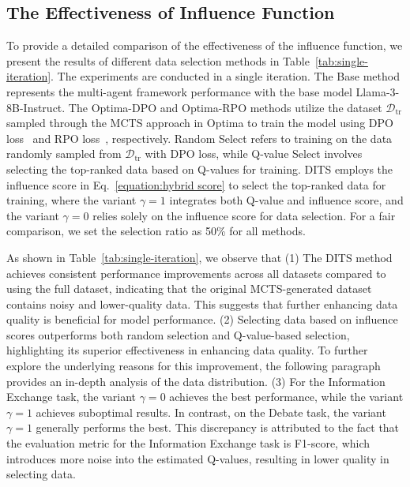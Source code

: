\subsection{The Effectiveness of Influence Function}
\label{subsection:single_iteration}

To provide a detailed comparison of the effectiveness of the influence function, we present the results of different data selection methods in Table~\ref{tab:single-iteration}. The experiments are conducted in a single iteration. The Base method represents the multi-agent framework performance with the base model Llama-3-8B-Instruct. The Optima-DPO and Optima-RPO methods utilize the dataset $\mathcal{D}_{\text{tr}}$ sampled through the MCTS approach in Optima to train the model using DPO loss~\cite{DBLP:conf/nips/RafailovSMMEF23} and RPO loss~\cite{DBLP:journals/corr/abs-2404-19733}, respectively. Random Select refers to training on the data randomly sampled from $\mathcal{D}_{\text{tr}}$ with DPO loss, while Q-value Select involves selecting the top-ranked data based on Q-values for training. DITS employs the influence score in Eq.~\eqref{equation:hybrid score} to select the top-ranked data for training, where the variant $\gamma=1$ integrates both Q-value and influence score, and the variant $\gamma=0$ relies solely on the influence score for data selection. For a fair comparison, we set the selection ratio as 50\% for all methods.

As shown in Table~\ref{tab:single-iteration}, we observe that (1) The DITS method achieves consistent performance improvements across all datasets compared to using the full dataset, indicating that the original MCTS-generated dataset contains noisy and lower-quality data. This suggests that further enhancing data quality is beneficial for model performance.  (2) Selecting data based on influence scores outperforms both random selection and Q-value-based selection, highlighting its superior effectiveness in enhancing data quality. To further explore the underlying reasons for this improvement, the following paragraph provides an in-depth analysis of the data distribution. (3) For the Information Exchange task, the variant $\gamma=0$ achieves the best performance, while the variant $\gamma=1$ achieves suboptimal results. In contrast, on the Debate task, the variant $\gamma=1$ generally performs the best. This discrepancy is attributed to the fact that the evaluation metric for the Information Exchange task is F1-score, which introduces more noise into the estimated Q-values, resulting in lower quality in selecting data.




